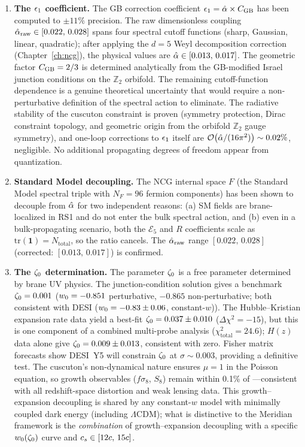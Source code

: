\begin{enumerate}
\item \textbf{The $\epsilon_1$ coefficient.} The GB correction coefficient $\epsilon_1 = \hat{\alpha} \times C_{\mathrm{GB}}$ has been computed to ${\pm}11\%$ precision. The raw dimensionless coupling $\hat{\alpha}_{\mathrm{raw}} \in [0.022,\, 0.028]$ spans four spectral cutoff functions (sharp, Gaussian, linear, quadratic); after applying the $d = 5$ Weyl decomposition correction (Chapter~\ref{ch:ncg}), the physical values are $\hat{\alpha} \in [0.013,\, 0.017]$. The geometric factor $C_{\mathrm{GB}} = 2/3$ is determined analytically from the GB-modified Israel junction conditions on the $\mathbb{Z}_2$ orbifold. The remaining cutoff-function dependence is a genuine theoretical uncertainty that would require a non-perturbative definition of the spectral action to eliminate. The radiative stability of the cuscuton constraint is proven (symmetry protection, Dirac constraint topology, and geometric origin from the orbifold $\mathbb{Z}_2$ gauge symmetry), and one-loop corrections to $\epsilon_1$ itself are $\mathcal{O}\!\left(\hat{\alpha}/(16\pi^2)\right) \sim 0.02\%$, negligible. No additional propagating degrees of freedom appear from quantization.

\item \textbf{Standard Model decoupling.} The NCG internal space $F$ (the Standard Model spectral triple with $N_F = 96$ fermion components) has been shown to decouple from $\hat{\alpha}$ for two independent reasons: (a) SM fields are brane-localized in RS1 and do not enter the bulk spectral action, and (b) even in a bulk-propagating scenario, both the $\mathcal{E}_5$ and $R$ coefficients scale as $\mathrm{tr}(\mathbf{1}) = N_{\mathrm{total}}$, so the ratio cancels. The $\hat{\alpha}_{\mathrm{raw}}$ range $[0.022,\, 0.028]$ (corrected: $[0.013,\, 0.017]$) is confirmed.

\item \textbf{The $\zeta_0$ determination.} The parameter $\zeta_0$ is a free parameter determined by brane UV physics. The junction-condition solution gives a benchmark $\zeta_0 = 0.001$ ($w_0 = -0.851$ perturbative, $-0.865$ non-perturbative; both consistent with DESI ($w_0 = -0.83 \pm 0.06$, constant-$w$)). The Hubble--Kristian expansion rate data yield a best-fit $\zeta_0 = 0.037 \pm 0.010$ ($\Delta\chi^2 = -15$), but this is one component of a combined multi-probe analysis ($\chi^2_{\mathrm{total}} = 24.6$); $H(z)$ data alone give $\zeta_0 = 0.009 \pm 0.013$, consistent with zero. Fisher matrix forecasts show DESI~Y5 will constrain $\zeta_0$ at $\sigma \sim 0.003$, providing a definitive test. The cuscuton's non-dynamical nature ensures $\mu = 1$ in the Poisson equation, so growth observables ($f\sigma_8$, $S_8$) remain within 0.1\% of \LCDM---consistent with all redshift-space distortion and weak lensing data. This growth--expansion decoupling is shared by any constant-$w$ model with minimally coupled dark energy (including $\Lambda$CDM); what is distinctive to the Meridian framework is the \emph{combination} of growth--expansion decoupling with a specific $w_0(\zeta_0)$ curve and $c_s \in [12c,\, 15c]$.


\end{enumerate}
